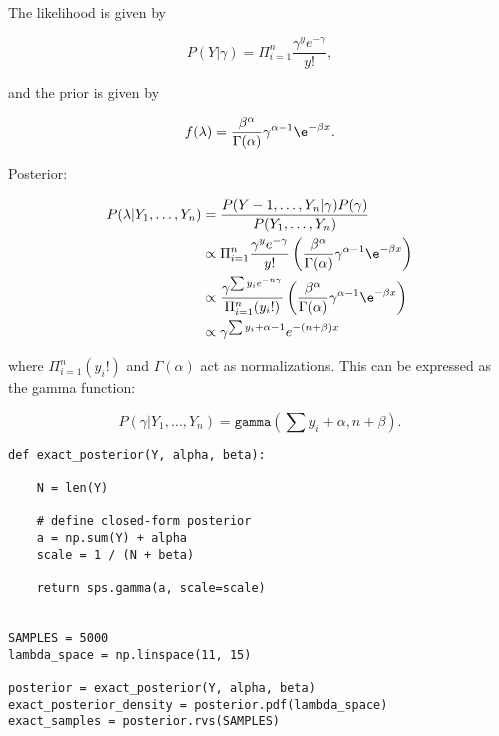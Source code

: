 \subsection{}
The likelihood is given by

\begin{equation*}
    P(Y|\gamma) = \Pi_{i=1}^n \frac{\gamma^y e^{-\gamma}}{y!},
\end{equation*}

and the prior is given by

\begin{equation*}
    f(\lambda ) = \frac{\beta^\alpha}{\Gamma(\alpha)}\gamma^{\alpha - 1} \e^{-\beta x}.
\end{equation*}

Posterior:

\begin{align*}
    P(\lambda | Y_1, \ldots, Y_n) &= \frac{P(Y-1, \ldots, Y_n | \gamma) P(\gamma)}{P(Y_1, \ldots, Y_n)} \\
                                 & \propto \Pi_{i=1}^{n} \frac{\gamma^y e^{-\gamma}}{y!} \left( \frac{\beta^\alpha}{\Gamma(\alpha)}\gamma^{\alpha - 1} \e^{-\beta x} \right) \\
                                 & \propto \frac{\gamma^{\sum y_i e^{-n\gamma}}}{\Pi_{i=1}^n (y_i!)} \left( \frac{\beta^\alpha}{\Gamma(\alpha)}\gamma^{\alpha - 1} \e^{-\beta x} \right) \\
                                 & \propto \gamma^{\sum y_i + \alpha - 1} e^{-(n + \beta) x}
\end{align*}        

where $\Pi_{i=1}^n(y_i!)$ and $\Gamma(\alpha)$ act as normalizations. This can be expressed as the gamma function:

\begin{equation*}
    P(\gamma|Y_1, \ldots, Y_n) = \texttt{gamma} (\sum y_i + \alpha, n + \beta).
\end{equation*}


\begin{verbatim}
def exact_posterior(Y, alpha, beta):

    N = len(Y)

    # define closed-form posterior
    a = np.sum(Y) + alpha
    scale = 1 / (N + beta)
    
    return sps.gamma(a, scale=scale)


SAMPLES = 5000
lambda_space = np.linspace(11, 15)

posterior = exact_posterior(Y, alpha, beta)
exact_posterior_density = posterior.pdf(lambda_space)
exact_samples = posterior.rvs(SAMPLES)
\end{verbatim}
